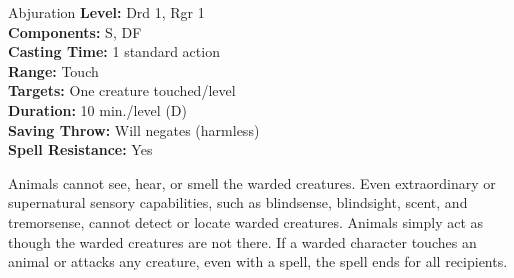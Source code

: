 {Abjuration}
{
	\textbf{Level:}
	Drd 1, Rgr 1\\
	\textbf{Components:}
	S, DF\\
	\textbf{Casting Time:}
	1 standard action\\
	\textbf{Range:}
	Touch\\
	\textbf{Targets:}
	One creature touched/level\\
	\textbf{Duration:}
	10 min./level (D)\\
	\textbf{Saving Throw:}
	Will negates (harmless)\\
	\textbf{Spell Resistance:}
	Yes\\
}
{
	Animals cannot see, hear, or smell the warded creatures. Even extraordinary or supernatural sensory capabilities, such as blindsense, blindsight, scent, and tremorsense, cannot detect or locate warded creatures. Animals simply act as though the warded creatures are not there. If a warded character touches an animal or attacks any creature, even with a spell, the spell ends for all recipients.

}
